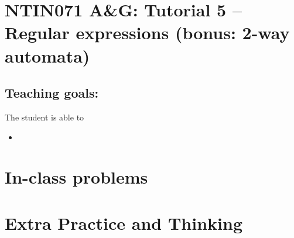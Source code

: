 \documentclass[a4paper,12pt]{amsart}
\begin{document}
\thispagestyle{empty}

\section*{NTIN071 A\&G: Tutorial 5 -- Regular expressions (bonus: 2-way automata)}

\medskip

\subsection*{Teaching goals:} The student is able to

    \begin{itemize}\setlength{\itemsep}{0pt}
        \item 
    \end{itemize}


\section*{In-class problems}


\medskip\begin{problem}

\end{problem}


\section*{Extra Practice and Thinking}


\medskip\begin{problem}

\end{problem}
\end{document}
